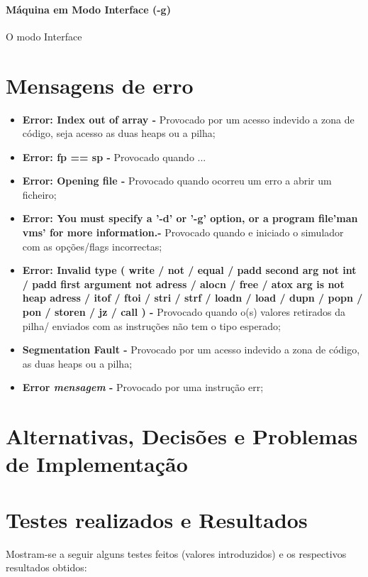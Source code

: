 \documentclass{report}
\begin{document}
\paragraph{\quad Máquina em Modo Interface (-g)}
  O modo Interface
\section{Mensagens de erro}

\begin{itemize}
\item \textbf{Error: Index out of array - } Provocado por um acesso indevido a zona de código, seja acesso as duas heaps ou a pilha;
\item \textbf{Error: fp == sp - } Provocado quando ...
\item \textbf{Error: Opening file - } Provocado quando ocorreu um erro a abrir um ficheiro;
\item \textbf{Error: You must specify a '-d' or '-g' option, or a program file\nTry 'man vms' for more information.\n - } Provocado quando e iniciado o simulador
com as opções/flags incorrectas;
\item \textbf{Error: Invalid type ( write / not / equal / padd second arg not int / padd first argument not adress / alocn / free /
 atox arg is not heap adress / itof / ftoi / stri / strf / loadn / load / dupn / popn / pon / storen / jz / call ) - } Provocado
 quando o(s) valores retirados da pilha/ enviados com as instruções não tem o tipo esperado;
\item \textbf{Segmentation Fault - } Provocado por um acesso indevido a zona de código, as duas heaps ou a pilha;
\item \textbf{Error \textit{mensagem} - } Provocado por uma instrução err;
\end{itemize}

\section{Alternativas, Decisões e Problemas de Implementação}
\section{Testes realizados e Resultados}
Mostram-se a seguir alguns testes feitos (valores introduzidos) e
os respectivos resultados obtidos:
\end{document}

